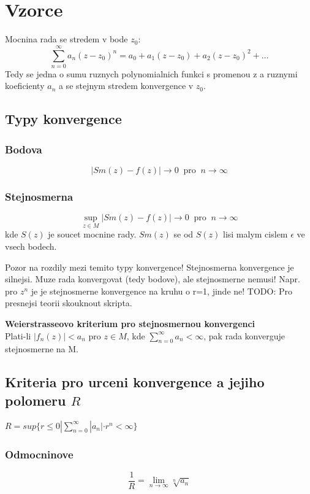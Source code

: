 \section*{Vzorce}
Mocnina rada se stredem v bode $z_0$:
$$\sum_{n=0}^\infty a_n (z-z_0)^n = a_0 + a_1 (z-z_0) +a_2 (z-z_0)^2 + \dots$$
Tedy se jedna o sumu ruznych polynomialnich funkci s promenou z a ruznymi koeficienty $a_n$ a se stejnym stredem konvergence v $z_0$.


\subsection*{Typy konvergence}
\subsubsection*{Bodova}
\begin{equation}
\label{eq:bod_kon}
|Sm(z)-f(z)| \to 0 \; \operatorname{pro} \; n \to \infty
\end{equation} 

\subsubsection*{Stejnosmerna}
\begin{equation}
\label{eq:ste_kon}
\operatorname{sup}_{z \in M} |Sm(z)-f(z)| \to 0 \; \operatorname{pro} \; n \to \infty
\end{equation}
kde $S(z)$ je soucet mocnine rady. $Sm(z)$ se od $S(z)$ lisi malym cislem $\epsilon$ ve vsech bodech.

Pozor na rozdily mezi temito typy konvergence! Stejnosmerna konvergence je silnejsi. Muze rada konvergovat (tedy bodove), ale stejnosmerne nemusi! Napr. pro $z^n$ je je stejnosmerne konvergence na kruhu o r=1, jinde ne!
TODO: Pro presnejsi teorii skouknout skripta.

\textbf{Weierstrasseovo kriterium pro stejnosmernou konvergenci}\\
Plati-li $|f_n(z)|<a_n$ pro $z \in M$, kde $\sum_{n=0}^\infty a_n < \infty$, pak rada konverguje stejnosmerne na M.

\subsection*{Kriteria pro urceni konvergence a jejiho polomeru $R$}

$R = sup \{r \leq 0 | \sum_{n=0}^\infty |a_n|\cdot r^n < \infty \}$

\subsubsection*{Odmocninove}
\begin{equation}
\label{eq:odm}
\frac{1}{R} = \lim_{n \to \infty} \sqrt[n]{a_n}
\end{equation}
